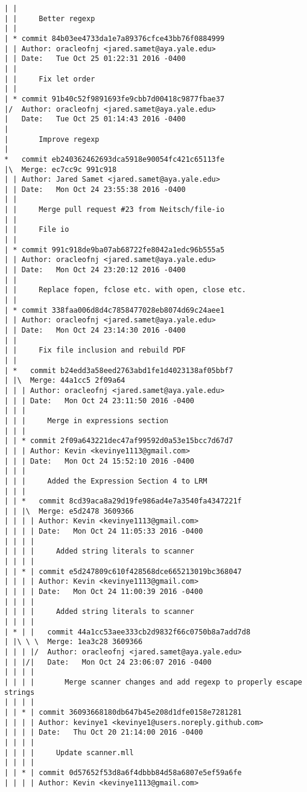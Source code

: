 \begin{lstlisting}
| |     
| |     Better regexp
| |   
| * commit 84b03ee4733da1e7a89376cfce43bb76f0884999
| | Author: oracleofnj <jared.samet@aya.yale.edu>
| | Date:   Tue Oct 25 01:22:31 2016 -0400
| | 
| |     Fix let order
| |   
| * commit 91b40c52f9891693fe9cbb7d00418c9877fbae37
|/  Author: oracleofnj <jared.samet@aya.yale.edu>
|   Date:   Tue Oct 25 01:14:43 2016 -0400
|   
|       Improve regexp
|    
*   commit eb240362462693dca5918e90054fc421c65113fe
|\  Merge: ec7cc9c 991c918
| | Author: Jared Samet <jared.samet@aya.yale.edu>
| | Date:   Mon Oct 24 23:55:38 2016 -0400
| | 
| |     Merge pull request #23 from Neitsch/file-io
| |     
| |     File io
| |   
| * commit 991c918de9ba07ab68722fe8042a1edc96b555a5
| | Author: oracleofnj <jared.samet@aya.yale.edu>
| | Date:   Mon Oct 24 23:20:12 2016 -0400
| | 
| |     Replace fopen, fclose etc. with open, close etc.
| |   
| * commit 338faa006d8d4c7858477028eb8074d69c24aee1
| | Author: oracleofnj <jared.samet@aya.yale.edu>
| | Date:   Mon Oct 24 23:14:30 2016 -0400
| | 
| |     Fix file inclusion and rebuild PDF
| |     
| *   commit b24edd3a58eed2763abd1fe1d4023138af05bbf7
| |\  Merge: 44a1cc5 2f09a64
| | | Author: oracleofnj <jared.samet@aya.yale.edu>
| | | Date:   Mon Oct 24 23:11:50 2016 -0400
| | | 
| | |     Merge in expressions section
| | |    
| | * commit 2f09a643221dec47af99592d0a53e15bcc7d67d7
| | | Author: Kevin <kevinye1113@gmail.com>
| | | Date:   Mon Oct 24 15:52:10 2016 -0400
| | | 
| | |     Added the Expression Section 4 to LRM
| | |      
| | *   commit 8cd39aca8a29d19fe986ad4e7a3540fa4347221f
| | |\  Merge: e5d2478 3609366
| | | | Author: Kevin <kevinye1113@gmail.com>
| | | | Date:   Mon Oct 24 11:05:33 2016 -0400
| | | | 
| | | |     Added string literals to scanner
| | | |     
| | * | commit e5d247809c610f428568dce665213019bc368047
| | | | Author: Kevin <kevinye1113@gmail.com>
| | | | Date:   Mon Oct 24 11:00:39 2016 -0400
| | | | 
| | | |     Added string literals to scanner
| | | |       
| * | |   commit 44a1cc53aee333cb2d9832f66c0750b8a7add7d8
| |\ \ \  Merge: 1ea3c28 3609366
| | | |/  Author: oracleofnj <jared.samet@aya.yale.edu>
| | |/|   Date:   Mon Oct 24 23:06:07 2016 -0400
| | | |   
| | | |       Merge scanner changes and add regexp to properly escape strings
| | | |     
| | * | commit 36093668180db647b45e208d1dfe0158e7281281
| | | | Author: kevinye1 <kevinye1@users.noreply.github.com>
| | | | Date:   Thu Oct 20 21:14:00 2016 -0400
| | | | 
| | | |     Update scanner.mll
| | | |     
| | * | commit 0d57652f53d8a6f4dbbb84d58a6807e5ef59a6fe
| | | | Author: Kevin <kevinye1113@gmail.com>

\end{lstlisting}
